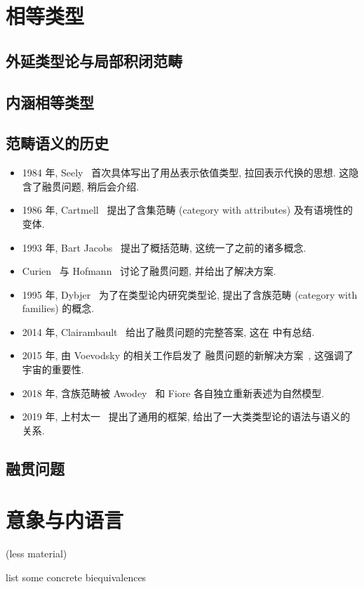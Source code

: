 \section{相等类型}

\subsection{外延类型论与局部积闭范畴}

\subsection{内涵相等类型}

\subsection{范畴语义的历史}


\begin{itemize}
\item 1984 年, Seely~\cite{seely:1984:lccc}
首次具体写出了用丛表示依值类型, 拉回表示代换的思想.
这隐含了融贯问题, 稍后会介绍.
\item 1986 年, Cartmell~\cite{cartmell:1986:contextualcat}
提出了含集范畴 (category with attributes) 及有语境性的变体.
\item 1993 年, Bart Jacobs~\cite{jacobs:1993:comprehensioncat}
提出了概括范畴, 这统一了之前的诸多概念.
\item Curien~\cite{curien:1993:coherence} 与 Hofmann~\cite{hofmann:1995:lccccoh}
讨论了融贯问题, 并给出了解决方案.
\item 1995 年, Dybjer~\cite{dybjer:1995:internal}
为了在类型论内研究类型论, 提出了含族范畴 (category with families) 的概念.
\item 2014 年, Clairambault~\cite{clairambault:2014:biequivalence}
给出了融贯问题的完整答案, 这在 \cite{curien:2014:revisit} 中有总结.
\item 2015 年, 由 Voevodsky 的相关工作启发了
融贯问题的新解决方案~\cite{lumsdaine:2015:universes}, 这强调了宇宙的重要性.
\item 2018 年, 含族范畴被 Awodey~\cite{awodey:2018:natural} 和 Fiore 各自独立重新表述为自然模型.
\item 2019 年, 上村太一~\cite{uemura:2019:general}
提出了通用的框架, 给出了一大类类型论的语法与语义的关系.
\end{itemize}

\subsection{融贯问题}

\section{意象与内语言}\label{category:inner}

(less material)

list some concrete biequivalences

